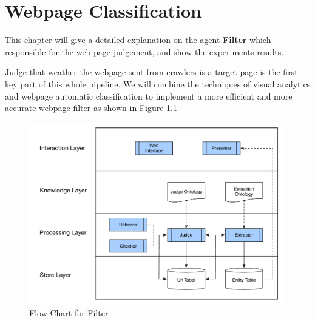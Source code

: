\chapter{Webpage Classification}\label{chapter:clf}
This chapter will give a detailed explanation on the agent \textbf{Filter} which responsible for the web page judgement, and show the experiments results.

Judge that weather the webpage sent from crawlers is a target page is the first key part of this whole pipeline. We will combine the techniques of visual analytics and webpage automatic classification to implement a more efficient and more accurate webpage filter as shown in Figure \ref{fig:fc:filter}

\begin{figure}[htb!]
	\centering
	\includegraphics[page=6,width=\textwidth]{images/diagrams.pdf}
	\caption{Flow Chart for Filter}\label{fig:fc:filter}
\end{figure}


